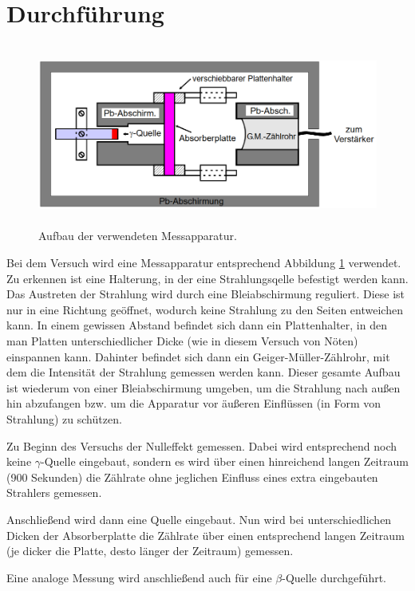 \section{Durchführung}
\label{sec:Durchführung}
\begin{figure}[H]
  \centering
  \includegraphics[height=6cm]{Aufbau.PNG}
  \caption{Aufbau der verwendeten Messapparatur. \cite{sample}}
  \label{fig:aufbau}
\end{figure}

Bei dem Versuch wird eine Messapparatur entsprechend Abbildung \ref{fig:aufbau} verwendet.
Zu erkennen ist eine Halterung, in der eine Strahlungsqelle befestigt werden kann.
Das Austreten der Strahlung wird durch eine Bleiabschirmung reguliert. Diese ist nur
in eine Richtung geöffnet, wodurch keine Strahlung zu den Seiten entweichen kann.
In einem gewissen Abstand befindet sich dann ein Plattenhalter, in den man Platten unterschiedlicher
Dicke (wie in diesem Versuch von Nöten) einspannen kann.
Dahinter befindet sich dann ein Geiger-Müller-Zählrohr, mit dem die Intensität der Strahlung gemessen werden kann. Dieser gesamte Aufbau
ist wiederum von einer Bleiabschirmung umgeben, um die Strahlung nach außen hin abzufangen bzw.
um die Apparatur vor äußeren Einflüssen (in Form von Strahlung) zu schützen.

Zu Beginn des
Versuchs der Nulleffekt gemessen. Dabei wird entsprechend noch keine $\gamma$-Quelle eingebaut,
sondern es wird über einen hinreichend langen Zeitraum (900 Sekunden) die Zählrate ohne
jeglichen Einfluss eines extra eingebauten Strahlers gemessen.

Anschließend wird dann eine Quelle eingebaut. Nun wird bei unterschiedlichen Dicken
der Absorberplatte die Zählrate über einen entsprechend langen Zeitraum (je dicker die
Platte, desto länger der Zeitraum) gemessen.

Eine analoge Messung wird anschließend auch für eine $\beta$-Quelle durchgeführt.
